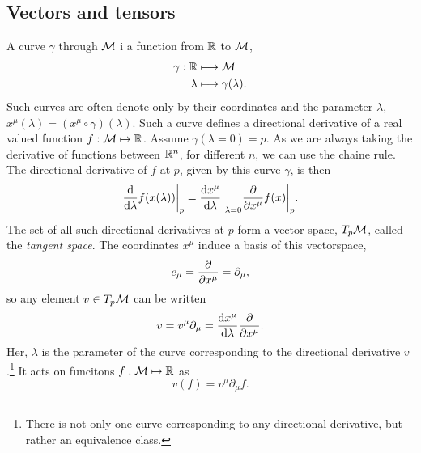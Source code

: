 \subsection*{Vectors and tensors}

A curve $\gamma$ through $\mathcal{M}$ i a function from $\mathbb{R}$ to $\mathcal{M}$,
%
\begin{align}
    \gamma : \mathbb{R} &\longmapsto \mathcal{M} \\
    \lambda & \longmapsto \gamma(\lambda).
\end{align}
%
Such curves are often denote only by their coordinates and the parameter $\lambda$, $x^\mu(\lambda) = (x^\mu \circ \gamma)(\lambda)$.
Such a curve defines a directional derivative of a real valued function $f: \mathcal{M} \mapsto \mathbb{R}$.
Assume $\gamma(\lambda = 0) = p$.
As we are always taking the derivative of functions between $\mathbb{R}^n$, for different $n$, we can use the chaine rule.
The directional derivative of $f$ at $p$, given by this curve $\gamma$, is then
%
\begin{equation}
    \diff{}{\lambda} f(x(\lambda)) \bigg |_p = \diff{x^\mu}{\lambda} \bigg |_{\lambda = 0}  \diffp{}{x^\mu} f(x) \bigg |_p.
\end{equation}
%
The set of all such directional derivatives at $p$ form a vector space, $T_p \mathcal{M}$, called the \emph{tangent space}.
The coordinates $x^\mu$ induce a basis of this vectorspace, 
%
\begin{equation}
    e_\mu = \diffp{}{x^\mu} = \partial_\mu,
\end{equation}
%
so any element $v \in T_p \mathcal{M}$ can be written
%
\begin{equation}
    v = v^\mu \partial_\mu = \diff{x^\mu}{\lambda} \diffp{}{x^\mu}.
\end{equation}
%
Her, $\lambda$ is the parameter of the curve corresponding to the directional derivative $v$.\footnote{There is not only one curve corresponding to any directional derivative, but rather an equivalence class. }
It acts on funcitons $f : \mathcal{M} \mapsto \mathbb{R}$ as
%
\begin{equation}
    v(f) = v^\mu \partial_\mu f.
\end{equation}
%

